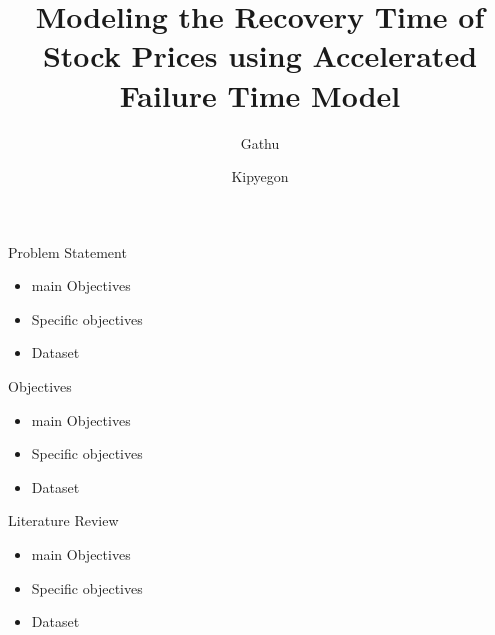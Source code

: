 \documentclass[14pt,aspectratio=169]{beamer}
\begin{document}
\title[Stock market Recovery time]{Modeling the Recovery Time of Stock Prices using Accelerated Failure Time Model }
\author{Gathu \and Kipyegon}
\maketitle
\begin{frame}{Problem Statement}
\begin{itemize}
	\item<1-> main Objectives
	\item<2-> Specific objectives
	\item <3-> Dataset
\end{itemize}
\end{frame}

\begin{frame}{Objectives}
\begin{itemize}
	\item<1-> main Objectives
	\item<2-> Specific objectives
	\item <3-> Dataset
\end{itemize}
\end{frame}


\begin{frame}{Literature Review}
\begin{itemize}
	\item<1-> main Objectives
	\item<2-> Specific objectives
	\item <3-> Dataset
\end{itemize}
\end{frame}
\end{document}
